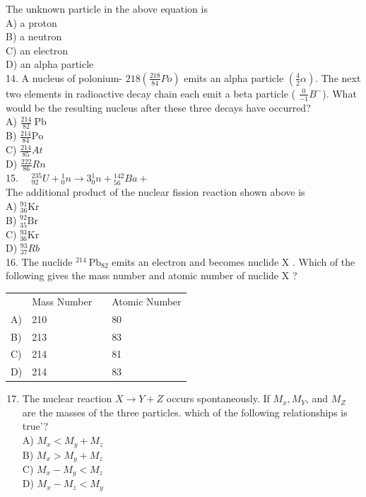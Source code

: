 \begin{enumerate}
The unknown particle in the above equation is\\
A) a proton\\
B) a neutron\\
C) an electron\\
D) an alpha particle\\
14. A nucleus of polonium- $218\left(\frac{218}{84} P o\right)$ emits an alpha particle $\left(\frac{4}{2} \alpha\right)$. The next two elements in radioactive decay chain each emit a beta particle ( $\frac{0}{-1} B^{-}$). What would be the resulting nucleus after these three decays have occurred?\\
A) $\frac{214}{82} \mathrm{~Pb}$\\
B) $\frac{214}{84} \mathrm{Po}$\\
C) $\frac{214}{85} A t$\\
D) $\frac{222}{86} R n$\\
15. $\quad{ }_{92}^{235} U+{ }_{0}^{1} n \rightarrow 3{ }_{0}^{1} n+{ }_{56}^{142} B a+$ $\qquad$\\
The additional product of the nuclear fission reaction shown above is\\
A) ${ }_{36}^{91} \mathrm{Kr}$\\
B) ${ }_{35}^{92} \mathrm{Br}$\\
C) ${ }_{36}^{93} \mathrm{Kr}$\\
D) ${ }_{37}^{93} R b$\\
16. The nuclide ${ }^{214} \mathrm{~Pb}_{82}$ emits an electron and becomes nuclide X . Which of the following gives the mass number and atomic number of nuclide X ?

\begin{center}
\begin{tabular}{llll}
 & Mass Number &  & Atomic Number \\
A) & 210 &  & 80 \\
B) & 213 &  & 83 \\
C) & 214 &  & 81 \\
D) & 214 &  & 83 \\
\end{tabular}
\end{center}

\begin{enumerate}
  \setcounter{enumi}{16}
  \item The nuclear reaction $X \rightarrow Y+Z$ occurs spontaneously. If $M_{x}, M_{Y}$, and $M_{Z}$ are the masses of the three particles. which of the following relationships is true'?\\
A) $M_{x}<M_{y}+M_{z}$\\
B) $M_{x}>M_{y}+M_{z}$\\
C) $M_{x}-M_{y}<M_{z}$\\
D) $M_{x}-M_{z}<M_{y}$
\end{enumerate}


\end{enumerate}
